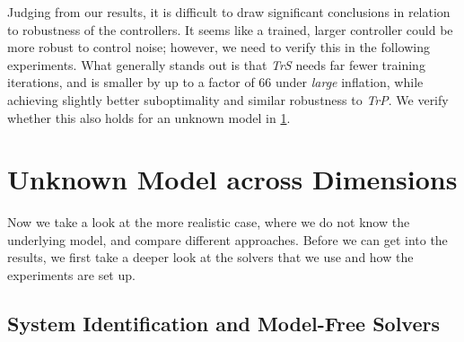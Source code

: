 Judging from our results, it is difficult to draw significant conclusions in relation to robustness of the controllers.
It seems like a trained, larger controller could be more robust to control noise; however, we need to verify this in
the following experiments. What generally stands out is that \emph{TrS} needs far fewer training iterations, and
is smaller by up to a factor of $66$ under \emph{large} inflation, while achieving
slightly better suboptimality and similar robustness to \emph{TrP}. We verify whether this also holds for
an unknown model in \cref{sec:unknown-model}.

\section{Unknown Model across Dimensions}
\label{sec:unknown-model}

Now we take a look at the more realistic case, where we do not know the underlying model, and compare different approaches.
Before we can get into the results, we first take a deeper look at the solvers that we use and how the experiments are
set up.

\subsection{System Identification and Model-Free Solvers}
\label{subsec:unknown-model-setting}

